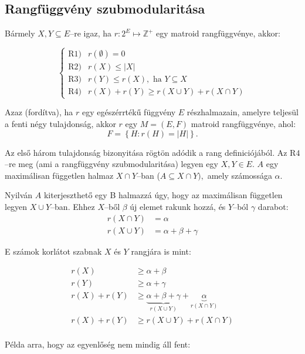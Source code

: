\subsection{Rangfüggvény szubmodularitása}
Bármely $X, Y \subseteq E$--re igaz, ha $r:2^E \mapsto \mathbb{Z}^+$ egy matroid
rangfüggvénye, akkor:

\[
\begin{cases}
\mbox{R1)}& r(\emptyset) = 0 \\
\mbox{R2)}& r(X) \leq |X| \\
\mbox{R3)}& r(Y) \leq r(X), \mbox{ ha } Y \subseteq X \\
\mbox{R4)}& r(X)+ r(Y) \geq r(X \cup Y) + r (X \cap Y)
\end{cases}
\]

Azaz (fordítva), ha $r$ egy egészérrtékű függvény $E$ részhalmazain, amelyre
teljesül a fenti négy tulajdonság, akkor $r$ egy $M=(E,F)$ matroid rangfüggvénye,
ahol:
\[F=\left\{ H : r(H)=|H| \right\}. \]

Az első három tulajdonság bizonyitása rögtön adódik a rang definiciójából. Az
R$4$--re meg (ami a rangfüggvény szubmodularitása) legyen egy $X,Y \in E$. $A$
egy maximálisan független halmaz $X \cap Y$--ban ($A \subseteq X \cap Y),$ amely
számossága $\alpha$. 

Nyilván $A$ kiterjeszthető egy B halmazzá úgy, hogy az maximálisan független
legyen $X \cup Y$--ban. Ehhez $X$--ből $\beta$ új elemet rakunk hozzá, és
$Y$--ból $\gamma$ darabot:
\begin{align*}
r(X \cap Y) &= \alpha \\
r(X \cup Y) &= \alpha + \beta + \gamma
\end{align*}

E számok korlátot szabnak $X$ és $Y$ rangjára is mint: 

\begin{align*}
r(X) &\geq \alpha + \beta \\ 
r(Y) &\geq \alpha + \gamma \\
r(X) + r(Y) &\geq \underbrace{\alpha + \beta + \gamma}_{r(X \cup Y)} + \underbrace{\alpha}_{r(X \cap Y)} \\
r(X) + r(Y) &\geq r(X \cup Y) + r(X \cap Y) \\
\end{align*}

Példa arra, hogy az egyenlőség nem mindig áll fent:
\vspace{0.4cm}

